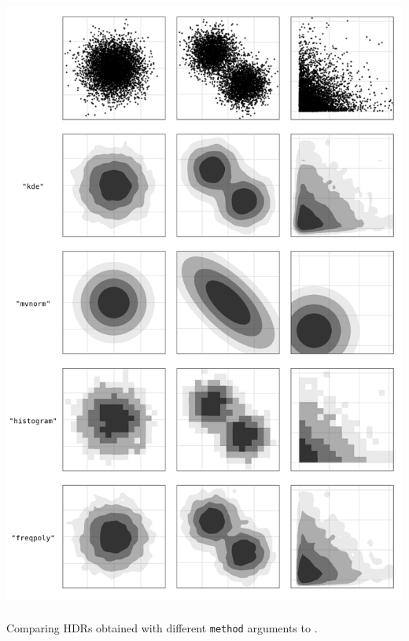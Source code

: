 \begin{knitrout}
\color{fgcolor}\begin{widefigure}[p]

{\centering \includegraphics[width=5.5in,height=8in]{figures/ex-methods-1}

}

\caption{Comparing HDRs obtained with different {\tt method} arguments to .}\label{fig:ex-methods}
\end{widefigure}

\end{knitrout}




